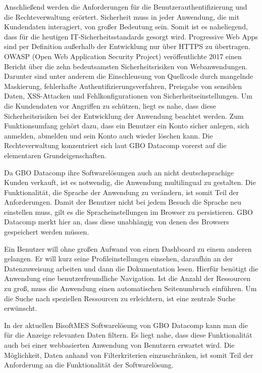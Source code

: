 Anschließend werden die Anforderungen für die Benutzerauthentifizierung und die Rechteverwaltung erörtert.
Sicherheit muss in jeder Anwendung, die mit Kundendaten interagiert, von großer Bedeutung sein.
Somit ist es naheliegend, dass für die heutigen IT-Sicherheitsstandards gesorgt wird. Progressive
Web Apps sind per Definition außerhalb der Entwicklung nur über HTTPS zu übertragen.\cite[S. 16]{KevinFrankPWAMasterarbeit}
OWASP (Open Web Application Security Project) veröffentlichte 2017 einen Bericht über die zehn
bedeutsamsten Sicherheitsrisiken von Webanwendungen. Darunter sind unter anderem die Einschleusung
von Quellcode durch mangelnde Maskierung, fehlerhafte Authentifizierungsverfahren, Preisgabe von sensiblen Daten,
XSS-Attacken und Fehlkonfigurationen von Sicherheitseinstellungen.\cite[S. 4]{OWASPTopTen}
Um die Kundendaten vor Angriffen zu schützen, liegt es nahe, dass diese Sicherheitsrisiken bei der
Entwicklung der Anwendung beachtet werden. Zum Funktionsumfang gehört dazu,
dass ein Benutzer ein Konto sicher anlegen, sich anmelden, abmelden und sein Konto auch wieder
löschen kann. Die Rechteverwaltung konzentriert sich laut GBO Datacomp vorerst auf die elementaren
Grundeigenschaften.

Da GBO Datacomp ihre Softwarelösungen auch an nicht deutschsprachige Kunden verkauft, ist es notwendig,
die Anwendung multilingual zu gestalten. Die Funktionalität, die Sprache der Anwendung zu verändern,
ist somit Teil der Anforderungen. Damit der Benutzer nicht bei jedem Besuch die Sprache neu einstellen
muss, gilt es die Spracheinstellungen im Browser zu persistieren. GBO Datacomp merkt hier an, dass diese
unabhängig von denen des Browsers gespeichert werden müssen.

Ein Benutzer will ohne großen Aufwand von einen Dashboard zu einem anderen gelangen. Er will kurz seine Profileinstellungen
einsehen, daraufhin an der Datenzuweisung arbeiten und dann die Dokumentation lesen.
Hierfür benötigt die Anwendung eine benutzerfreundliche Navigation. Ist die Anzahl der Ressourcen zu 
groß, muss die Anwendung einen automatischen Seitenumbruch einführen. Um die Suche nach speziellen
Ressourcen zu erleichtern, ist eine zentrale Suche erwünscht.

In der aktuellen BisoftMES Softwarelösung von GBO Datacomp kann man die für die Anzeige relevanten Daten filtern.\cite[S. 14]{BisoftMESHandbuch}
Es liegt nahe, dass diese Funktionalität auch bei einer webbasierten Anwendung von Benutzern erwartet wird. Die Möglichkeit, Daten
anhand von Filterkriterien einzuschränken, ist somit Teil der Anforderung an die Funktionalität der Softwarelösung.

